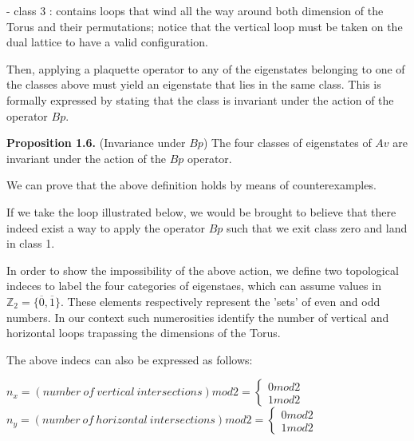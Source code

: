 \documentclass[12pt]{report}
\begin{document}
\begin{minipage}{1\textwidth}
		- class 3 : contains loops that wind all the way around both dimension of the Torus and their permutations; notice that the vertical loop must be taken on the dual lattice to have a valid configuration.\newline
		
		Then, applying a plaquette operator to any of the eigenstates belonging to one of the classes above must yield an eigenstate that lies in the same class. This is formally expressed by stating that the class is invariant under the action of the operator $Bp$. \newline
		
		\textbf{Proposition 1.6.} (Invariance under $Bp$) The four classes of eigenstates of $Av$ are invariant under the action of the $Bp$ operator. \newline
		
		We can prove that the above definition holds by means of counterexamples.\newline
		 
		If we take the loop illustrated below, we would be brought to believe that there indeed exist a way to apply the operator $Bp$ such that we exit class zero and land in class 1. \newline
		
		
		In order to show the impossibility of the above action, we define two topological indeces to label the four categories of eigenstaes, which can assume values in $\mathbb{Z}_2=\{\overline{0},\overline{1} \}$. These elements respectively represent the 'sets' of even and odd numbers. In our context such numerosities identify the number of vertical and horizontal loops trapassing the dimensions of the Torus. \newline
		
		The above indecs can also be expressed as follows: 
		
		\begin{center}
			$n_x= (number \ of \ vertical \ intersections)mod2 = 
			\begin{cases} 
				0mod2 \\
			    1mod2  
			\end{cases}$ 
			$n_y= (number \ of \ horizontal \ intersections)mod2 =\begin{cases} 
				0mod2 \\
				1mod2  
			\end{cases}$ 
		\end{center}
		
		
	
	\end{minipage}
	
\end{document}
